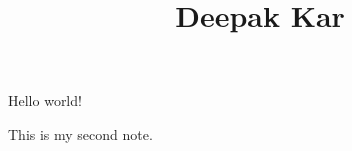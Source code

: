 \documentclass{article}
\begin{document}
\title{Deepak Kar}
\maketitle
Hello world!

This is my second note.
\end{document}
